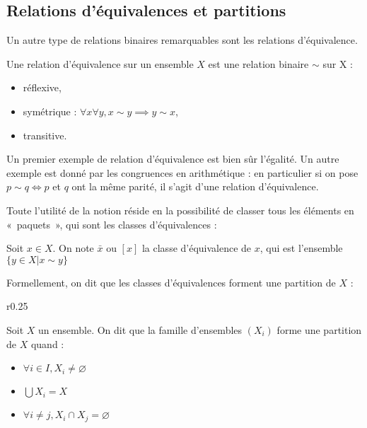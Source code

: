 \subsection*{Relations d'équivalences et partitions}
Un autre type de relations binaires remarquables sont les relations d'équivalence.

\begin{defini}
    Une relation d'équivalence sur un ensemble $X$ est une relation binaire $\sim$ sur X :
    \begin{itemize}
        \item réflexive,
        \item symétrique : $\forall x \forall y, x\sim y \implies y \sim x$,
        \item transitive.
    \end{itemize}
\end{defini}

Un premier exemple de relation d'équivalence est bien sûr l'égalité. Un autre exemple est donné par les congruences en arithmétique : en particulier si on pose $p \sim q \iff p$ et $q$ ont la même parité, il s'agit d'une relation d'équivalence.

Toute l'utilité de la notion réside en la possibilité de classer tous les éléments en «~paquets~», qui sont les classes d'équivalences :

\begin{defini}
    Soit $x\in X$. On note $\bar{x}$ ou $[x]$ la classe d'équivalence de $x$, qui est l'ensemble $\{y\in X | x\sim y\}$
\end{defini}

Formellement, on dit que les classes d'équivalences forment une partition de $X$ :
\begin{wrapfigure}[2]{r}{0.25\textwidth}
    \vspace{-0.5em}
\end{wrapfigure}

\vspace{-1em}
\begin{defini}
    Soit $X$ un ensemble. On dit que la famille d'ensembles $(X_i)$ forme une partition de $X$ quand :
    \begin{itemize}
        \item $\forall i \in I, X_i \neq \varnothing$
        \item $\bigcup X_i = X$
        \item $\forall i \neq j, X_i \cap X_j = \varnothing$
    \end{itemize}
\end{defini}